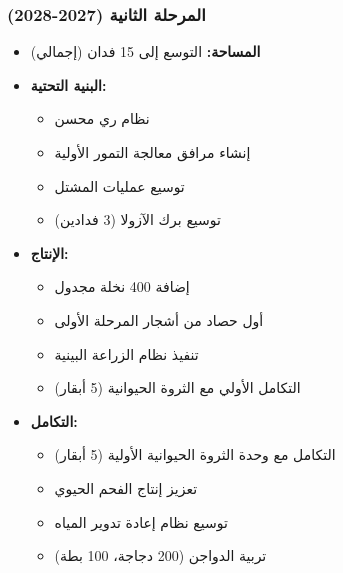 \subsubsection{المرحلة الثانية (2027-2028)}
\begin{itemize}
    \item \textbf{المساحة:} التوسع إلى 15 فدان (إجمالي)
    \item \textbf{البنية التحتية:}
    \begin{itemize}
        \item نظام ري محسن
        \item إنشاء مرافق معالجة التمور الأولية
        \item توسيع عمليات المشتل
        \item توسيع برك الآزولا (3 فدادين)
    \end{itemize}
    \item \textbf{الإنتاج:}
    \begin{itemize}
        \item إضافة 400 نخلة مجدول
        \item أول حصاد من أشجار المرحلة الأولى
        \item تنفيذ نظام الزراعة البينية
        \item التكامل الأولي مع الثروة الحيوانية (5 أبقار)
    \end{itemize}
    \item \textbf{التكامل:}
    \begin{itemize}
        \item التكامل مع وحدة الثروة الحيوانية الأولية (5 أبقار)
        \item تعزيز إنتاج الفحم الحيوي
        \item توسيع نظام إعادة تدوير المياه
        \item تربية الدواجن (200 دجاجة، 100 بطة)
    \end{itemize}
\end{itemize}

